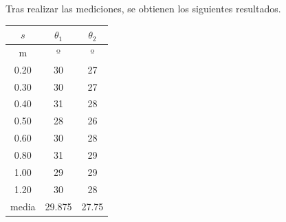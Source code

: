 \documentclass[10pt,a4paper,hidelinks]{article}
\begin{document}
\begin{multicols}{2}
\begin{center}
\begin{tikzpicture}[>=latex]
		
    
    
    
    
    
    
    
    
\end{tikzpicture}
\end{center}


Tras realizar las mediciones, se obtienen los siguientes resultados.
\begin{center}
\begin{tabular}{ | c | c | c | }
\hline
$s$ & $\theta_1$ & $\theta_2$ \\ \hline
m    &  º &  º \\ \hline \hline
0.20 & 30 & 27 \\ \hline
0.30 & 30 & 27 \\ \hline
0.40 & 31 & 28 \\ \hline
0.50 & 28 & 26 \\ \hline
0.60 & 30 & 28 \\ \hline
0.80 & 31 & 29 \\ \hline
1.00 & 29 & 29 \\ \hline
1.20 & 30 & 28 \\ \hline \hline
media& 29.875 & 27.75 \\ \hline
\end{tabular}
\end{center}


\end{multicols}
\end{document}
